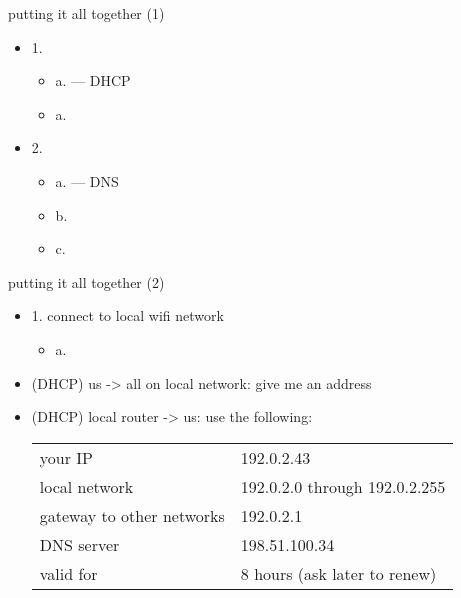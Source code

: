\usetikzlibrary{arrows.meta,matrix,fit}
\begin{frame}{putting it all together (1)}
    \begin{itemize}
    \item 1. 
        \begin{itemize}
        \item<2-> a.  --- DHCP
        \item<2-> a. 
        \end{itemize}
    \item 2. 
        \begin{itemize}
        \item<3-> a.  --- DNS
        \item<3-> b. 
        \item<3-> c. 
        \end{itemize}
    \end{itemize}
\end{frame}


\begin{frame}{putting it all together (2)}
    \begin{itemize}
    \item 1. connect to local wifi network
        \begin{itemize}
        \item a. 
        \end{itemize}
    \vspace{.5cm}
    \item<2-> (DHCP) us -> all on local network: give me an address
    \item<2-> (DHCP) local router -> us: use the following: 
    \begin{tabular}{l|l}
    your IP & 192.0.2.43 \\
    local network & 192.0.2.0 through 192.0.2.255 \\
    gateway to other networks & 192.0.2.1 \\
    DNS server & 198.51.100.34 \\
    valid for & 8 hours (ask later to renew) \\
    \end{tabular}
    \end{itemize}
\end{frame}

